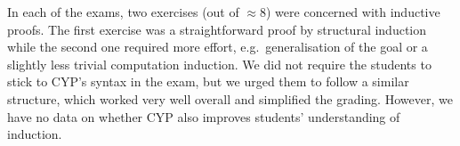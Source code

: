 In each of the exams, two exercises (out of $\approx 8$) were concerned with inductive proofs.
The first exercise was a straightforward proof by structural induction while the second one required more effort, e.g.\ generalisation of the goal or a slightly less trivial computation induction.
We did not require the students to stick to CYP's syntax in the exam, but we urged them to follow a similar structure,
which worked very well overall and simplified the grading.
However, we have no data on whether CYP also improves students' understanding of induction.

%
